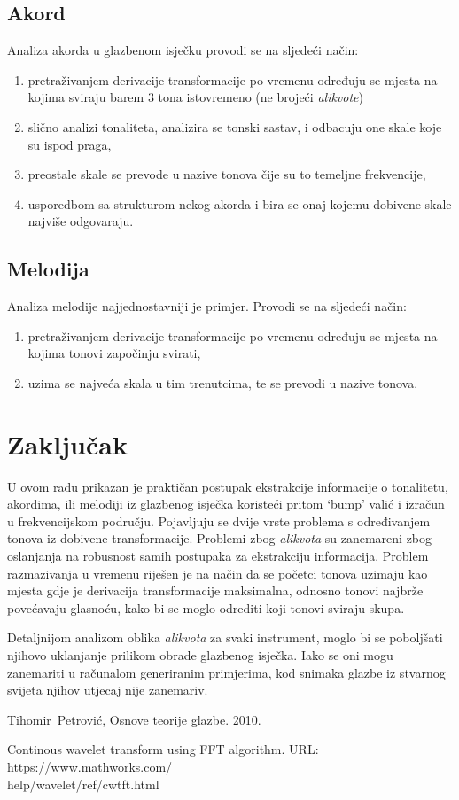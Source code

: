 \documentclass[a4paper, 11pt, twocolumn]{article}
\begin{document}
\subsection{Akord}
Analiza akorda u glazbenom isječku provodi se na sljedeći način:
\begin{enumerate}
  \item pretraživanjem derivacije transformacije po vremenu određuju se mjesta na kojima sviraju barem 3 tona istovremeno (ne brojeći \textit{alikvote})
  \item slično analizi tonaliteta, analizira se tonski sastav, i odbacuju one skale koje su ispod praga,
  \item preostale skale se prevode u nazive tonova čije su to temeljne frekvencije,
  \item usporedbom sa strukturom nekog akorda i bira se onaj kojemu dobivene skale najviše odgovaraju.
\end{enumerate}

\subsection{Melodija}
Analiza melodije najjednostavniji je primjer. Provodi se na sljedeći način:
\begin{enumerate}
  \item pretraživanjem derivacije transformacije po vremenu određuju se mjesta na kojima tonovi započinju svirati,
  \item uzima se najveća skala u tim trenutcima, te se prevodi u nazive tonova.
\end{enumerate}

\section{Zaključak}
U ovom radu prikazan je praktičan postupak ekstrakcije informacije o tonalitetu, akordima, ili melodiji iz glazbenog isječka koristeći pritom `bump' valić i izračun u frekvencijskom području.
Pojavljuju se dvije vrste problema s određivanjem tonova iz dobivene transformacije.
Problemi zbog \textit{alikvota} su zanemareni zbog oslanjanja na robusnost samih postupaka za ekstrakciju informacija.
Problem razmazivanja u vremenu riješen je na način da se početci tonova uzimaju kao mjesta gdje je derivacija transformacije maksimalna, odnosno tonovi najbrže povećavaju glasnoću, kako bi se moglo odrediti koji tonovi sviraju skupa.

Detaljnijom analizom oblika \textit{alikvota} za svaki instrument, moglo bi se poboljšati njihovo uklanjanje prilikom obrade glazbenog isječka.
Iako se oni mogu zanemariti u računalom generiranim primjerima, kod snimaka glazbe iz stvarnog svijeta njihov utjecaj nije zanemariv.

\begin{thebibliography}{25}
Tihomir~Petrović,
Osnove teorije glazbe.
2010.

Continous wavelet transform using FFT algorithm.
URL: https://www.mathworks.com/\\help/wavelet/ref/cwtft.html

\end{thebibliography} 
\end{document}
